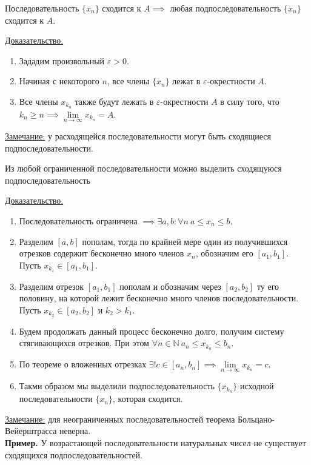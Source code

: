 \documentclass{article}
\begin{document}
\begin{lemma}
    Последовательность \(\{x_n\}\) сходится к \(A \implies \) любая подпоследовательность \(\{x_n\}\) сходится к \(A\). 
\end{lemma}
\noindent \underline{Доказательство.}
\begin{enumerate}
    \item Зададим произвольный \(\varepsilon > 0\).
    \item Начиная с некоторого \(n\), все члены \(\{x_n\}\) лежат в \(\varepsilon\)-окрестности \(A\).
    \item Все члены \(x_{k_n}\) также будут лежать в \(\varepsilon\)-окрестности \(A\) в силу того, что \(k_n \geq n \implies  \lim\limits_{n \to \infty} x_{k_n} = A\). 
\end{enumerate}
\noindent \underline{Замечание:} у расходящейся последовательности могут быть сходящиеся подпоследовательности.

\begin{theorem}
    \noindent Из любой ограниченной последовательности можно выделить сходящуюся подпоследовательность
\end{theorem}
\noindent \underline{Доказательство.}
\begin{enumerate}
    \item Последовательность ограничена \(\implies \exists a, b: \forall n\ a \leq x_n \leq b\).
    \item Разделим \({[a, b]}\) пополам, тогда по крайней мере один из получившихся отрезков содержит бесконечно много членов \(x_n\), обозначим его \({[a_1, b_1]}\). Пусть \(x_{k_1} \in {[a_1, b_1]}\). 
    \item Разделим отрезок \({[a_1, b_1]}\) пополам и обозначим через \({[a_2, b_2]}\) ту его половину, на которой лежит бесконечно много членов последовательности. Пусть \(x_{k_2} \in {[a_2, b_2]}\) и \(k_2 > k_1\).
    \item Будем продолжать данный процесс бесконечно долго, получим систему стягивающихся отрезков. При этом \(\forall n \in \mathbb{N}\ a_n \leq x_{k_n} \leq b_n\).
    \item По теореме о вложенных отрезках \(\exists! c \in {[a_n, b_n]} \implies \lim\limits_{n \to \infty} x_{k_n} = c\).
    \item Такми образом мы выделили подпоследовательность \(\{x_{k_n}\}\) исходной последовательности \(\{x_n\}\), которая сходится.   
\end{enumerate}
\noindent \underline{Замечание:} для неограниченных последовательностей теорема Больцано-Вейерштрасса неверна.\\
\textbf{Пример.} У возрастающей последовательности натуральных чисел не существует сходящихся подпоследовательностей.
\end{document}

